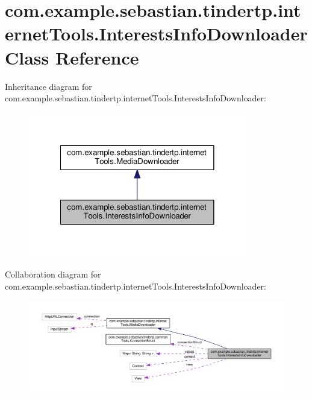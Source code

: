 \hypertarget{classcom_1_1example_1_1sebastian_1_1tindertp_1_1internetTools_1_1InterestsInfoDownloader}{}\section{com.\+example.\+sebastian.\+tindertp.\+internet\+Tools.\+Interests\+Info\+Downloader Class Reference}
\label{classcom_1_1example_1_1sebastian_1_1tindertp_1_1internetTools_1_1InterestsInfoDownloader}


Inheritance diagram for com.\+example.\+sebastian.\+tindertp.\+internet\+Tools.\+Interests\+Info\+Downloader\+:\nopagebreak
\begin{figure}[H]
\begin{center}
\leavevmode
\includegraphics[width=270pt]{classcom_1_1example_1_1sebastian_1_1tindertp_1_1internetTools_1_1InterestsInfoDownloader__inherit__graph}
\end{center}
\end{figure}


Collaboration diagram for com.\+example.\+sebastian.\+tindertp.\+internet\+Tools.\+Interests\+Info\+Downloader\+:\nopagebreak
\begin{figure}[H]
\begin{center}
\leavevmode
\includegraphics[width=350pt]{classcom_1_1example_1_1sebastian_1_1tindertp_1_1internetTools_1_1InterestsInfoDownloader__coll__graph}
\end{center}
\end{figure}
